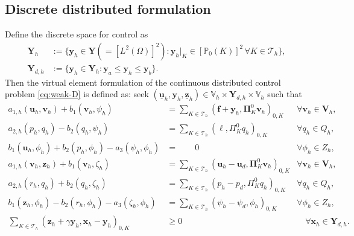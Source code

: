 \documentclass[smallextended]{svjour3}
\numberwithin{equation}{section}
\numberwithin{figure}{section}
\numberwithin{table}{section}
\newcommand\bV{\mathbf{V}}
\newcommand\bPi{\boldsymbol{\Pi}}
\newcommand\ff{\boldsymbol{f}}
\newcommand\buu{\underline{\boldsymbol{u}}}
\newcommand\buz{\underline{\boldsymbol{z}}}
\newcommand\bx{\boldsymbol{x}}
\newcommand\by{\boldsymbol{y}}
\newcommand\bu{\boldsymbol{u}}
\newcommand\bv{\boldsymbol{v}}
\newcommand\bz{\boldsymbol{z}}
\newcommand{\bYd}{\boldsymbol{Y}_d}
\newcommand{\bY}{\boldsymbol{Y}}
\newcommand\cT{\mathcal{T}}
\newcommand{\bbV}{\mathbb{V}}
\newcommand{\bbP}{\mathbb{P}}
\begin{document}
	\subsection{Discrete distributed formulation}
	Define the discrete space for control as
	\begin{align*}
		\bY_h &:= \lbrace \by_h \in \bY (=[L^2(\Omega)]^2) : \by_h |_K \in [\bbP_0(K)]^2 \, \forall K \in \mathcal{T}_h \rbrace, \\
        \bY_{d,h} & := \lbrace \by_h \in \bY_h: \by_a \le \by_h \le \by_b \rbrace.
	\end{align*}
    Then the virtual element formulation of the continuous distributed control problem \eqref{eq:weak-D} is defined as: seek $(\buu_h, \by_h, \buz_h) \in \bbV_h \times \bY_{d,h} \times \bbV_h$	such that
	\begin{subequations} \label{eq:weak-h-D}
		\begin{align}
			a_{1,h}(\bu_h, \bv_h) + b_1(\bv_h, \psi_h) &=  \sum_{K \in \cT_h} ( \ff + \by_h, \bPi^{0}_K \bv_h )_{0, K}    & \forall \bv_h \in \bV_h, \label{eq:weak-h-D-a}\\
			a_{2,h}(p_h, q_h) - b_2(q_h, \psi_h) & = \sum_{K \in \cT_h} ( \ell, \Pi^{0}_K q_h )_{0, K}  & \forall q_h \in Q_h, \label{eq:weak-h-D-b}\\
			b_1(\bu_h, \phi_h) + b_2(p_h, \phi_h) - a_3(\psi_h, \phi_h) & = \qquad 0  & \forall \phi_h \in Z_h, \label{eq:weak-h-D-c}\\
			a_{1,h}(\bv_h, \bz_h) + b_1(\bv_h, \zeta_h) &= \sum_{K \in \cT_h} ( \bu_h - \bu_d, \bPi^{0}_K \bv_h)_{0, K}   & \forall \bv_h \in \bV_h, \label{eq:weak-h-D-d} \\
			a_{2,h}(r_h, q_h) + b_2(q_h, \zeta_h) & = \sum_{K \in \cT_h} (p_h - p_d, \Pi^{0}_K  q_h)_{0, K}  & \forall q_h \in Q_h, \label{eq:weak-h-D-e} \\
			b_1(\bz_h, \phi_h) - b_2(r_h, \phi_h) - a_3(\zeta_h, \phi_h) & =\sum_{K \in \cT_h} (\psi_h - \psi_d,  \phi_h)_{0, K} \,\, & \forall \phi_h \in Z_h, \label{eq:weak-h-D-f} \\
			\sum_{K \in \cT_h} \left( \bz_h + \gamma \by_h, \bx_h - \by_h \right)_{0,K} & \ge  0 &\quad \forall \bx_h \in \bY_{d,h}.  \label{eq:optimality-h-D}
		\end{align}
	\end{subequations}
	
\end{document}
